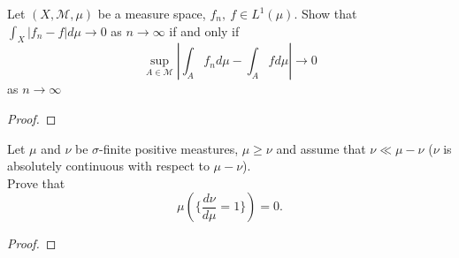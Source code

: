 \documentclass{article}
\newenvironment{problem}[2][Problem]{\begin{trivlist}
\item[\hskip \labelsep {\bfseries #1}\hskip \labelsep {\bfseries #2.}]}{\end{trivlist}}
\begin{document}
\pagebreak

\begin{problem}{3}
  Let $(X, \mathcal{M}, \mu)$ be a measure space, $f_n,\ f \in L^1(\mu)$.
  Show that $\int_X |f_n - f| d\mu \rightarrow 0$ as $n \rightarrow \infty$
  if and only if \[
    \sup_{A\in\mathcal{M}} \left|\int_A f_n d\mu - \int_A f d\mu \right| \rightarrow 0
  \] as $n \rightarrow \infty$
\end{problem}

\begin{proof}
\end{proof}

\pagebreak

\begin{problem}{4}
  Let $\mu$ and $\nu$ be $\sigma$-finite positive meastures, $\mu \geq \nu$
  and assume that $\nu \ll \mu - \nu$ ($\nu$ is absolutely continuous with
  respect to $\mu - \nu$). \\
  Prove that \[
    \mu\left(\{\frac{d\nu}{d\mu} = 1\}\right) = 0.
  \]
\end{problem}

\begin{proof}
\end{proof}
\end{document}
